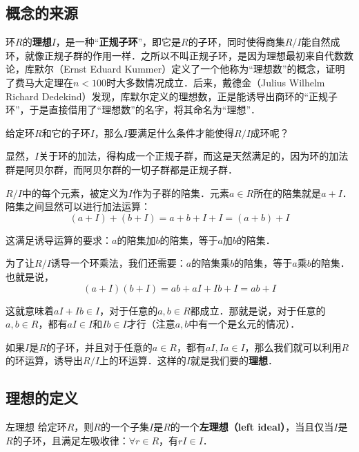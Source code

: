 
\subsection{概念的来源}

环$R$的\textbf{理想}$I$，是一种“\textbf{正规子环}”，即它是$R$的子环，同时使得商集$R/I$能自然成环，就像正规子群的作用一样．之所以不叫正规子环，是因为理想最初来自代数数论，库默尔（Ernst Eduard Kummer）定义了一个他称为“理想数”的概念，证明了费马大定理在$n<100$时大多数情况成立．后来，戴德金（Julius Wilhelm Richard Dedekind）发现，库默尔定义的理想数，正是能诱导出商环的“正规子环”，于是直接借用了“理想数”的名字，将其命名为“理想”．

给定环$R$和它的子环$I$，那么$I$要满足什么条件才能使得$R/I$成环呢？

显然，$I$关于环的加法，得构成一个正规子群，而这是天然满足的，因为环的加法群是阿贝尔群，而阿贝尔群的一切子群都是正规子群．

$R/I$中的每个元素，被定义为$I$作为子群的陪集．元素$a\in R$所在的陪集就是$a+I$．陪集之间显然可以进行加法运算：
\begin{equation}
(a+I)+(b+I)=a+b+I+I=(a+b)+I
\end{equation}

这满足诱导运算的要求：$a$的陪集加$b$的陪集，等于$a$加$b$的陪集．

为了让$R/I$诱导一个环乘法，我们还需要：$a$的陪集乘$b$的陪集，等于$a$乘$b$的陪集．也就是说，
\begin{equation}
(a+I)(b+I)=ab+aI+Ib+I=ab+I
\end{equation}

这就意味着$aI+Ib\in I$，对于任意的$a, b\in R$都成立．那就是说，对于任意的$a, b\in R$，都有$aI\in I$和$Ib\in I$才行（注意$a, b$中有一个是幺元的情况）．

如果$I$是$R$的子环，并且对于任意的$a\in R$，都有$aI, Ia\in I$，那么我们就可以利用$R$的环运算，诱导出$R/I$上的环运算．这样的$I$就是我们要的\textbf{理想}．

\subsection{理想的定义}

\begin{definition}{左理想}
给定环$R$，则$R$的一个子集$I$是$R$的一个\textbf{左理想（left ideal）}，当且仅当$I$是$R$的子环，且满足左吸收律：$\forall r\in R$，有$rI\in I$．
\end{definition}


